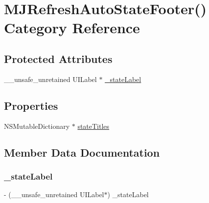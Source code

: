 \hypertarget{category_m_j_refresh_auto_state_footer_07_08}{}\section{M\+J\+Refresh\+Auto\+State\+Footer() Category Reference}
\label{category_m_j_refresh_auto_state_footer_07_08}
\subsection*{Protected Attributes}
\begin{DoxyCompactItemize}
\item 
\+\_\+\+\_\+unsafe\+\_\+unretained U\+I\+Label $\ast$ \mbox{\hyperlink{category_m_j_refresh_auto_state_footer_07_08_a23ab8b8506c1796310cd99b24587c016}{\+\_\+state\+Label}}
\end{DoxyCompactItemize}
\subsection*{Properties}
\begin{DoxyCompactItemize}
\item 
N\+S\+Mutable\+Dictionary $\ast$ \mbox{\hyperlink{category_m_j_refresh_auto_state_footer_07_08_a1f81e5ffb9c1e2ef511f40038c3b7f2c}{state\+Titles}}
\end{DoxyCompactItemize}


\subsection{Member Data Documentation}
\mbox{\label{category_m_j_refresh_auto_state_footer_07_08_a23ab8b8506c1796310cd99b24587c016}} 
\subsubsection{\texorpdfstring{\+\_\+state\+Label}{\_stateLabel}}
{\footnotesize\ttfamily -\/ (\+\_\+\+\_\+unsafe\+\_\+unretained U\+I\+Label$\ast$) \+\_\+state\+Label\hspace{0.3cm}{\ttfamily [protected]}}


